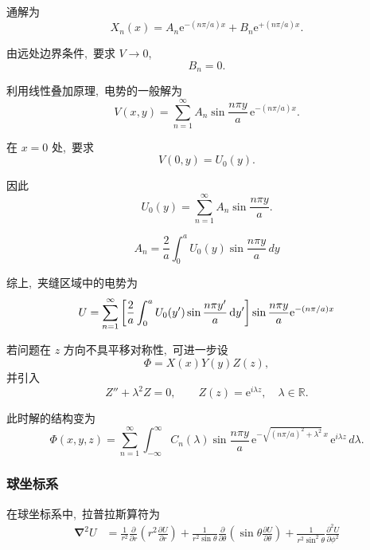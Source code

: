 通解为
\[
X_n(x)=A_n \mathrm{e}^{-(n\pi/a)x}+B_n \mathrm{e}^{+(n\pi/a)x}.
\]

由远处边界条件, \,要求 $V\to0$, \,
\[
B_n=0.
\]


利用线性叠加原理, \,电势的一般解为
\[
V(x,y)
=
\sum_{n=1}^{\infty}
A_n
\sin\frac{n\pi y}{a}
\,\mathrm{e}^{-(n\pi/a)x}.
\]

在 $x=0$ 处, \,要求
\[
V(0,y)=U_0(y).
\]

因此
\[
U_0(y)
=
\sum_{n=1}^{\infty}
A_n
\sin\frac{n\pi y}{a}.
\]

\[
{
A_n
=
\frac{2}{a}
\int_0^a
U_0(y)
\sin\frac{n\pi y}{a}
\,dy
}
\]




综上, \,夹缝区域中的电势为
\[
{
U
=
\sum_{n=1}^{\infty}
\left[
\frac{2}{a}
\int_0^a
U_0(y')
\sin\frac{n\pi y'}{a}
\dif y'
\right]
\sin\frac{n\pi y}{a}
\mathrm{e}^{-(n\pi/a)x}
}
\]

若问题在 $z$ 方向不具平移对称性, \,可进一步设
\[
\Phi = X(x)Y(y)Z(z),
\]
并引入
\[
Z'' + \lambda^2 Z = 0,
\qquad
Z(z)=\mathrm{e}^{i\lambda z},\quad \lambda\in\mathbb{R}.
\]

此时解的结构变为
\[
\Phi(x,y,z)
=
\sum_{n=1}^\infty
\int_{-\infty}^{\infty}
C_n(\lambda)
\sin\frac{n\pi y}{a}
\,\mathrm{e}^{-\sqrt{(n\pi/a)^2+\lambda^2}\,x}
\,\mathrm{e}^{i\lambda z}
\,d\lambda .
\]
\subsubsection{球坐标系}

在球坐标系中, \,拉普拉斯算符为
\begin{align*}
\boldsymbol\nabla^2 U
&=
\frac{1}{r^2}\frac{\partial}{\partial r}
\left(
r^2 \frac{\partial U}{\partial r}
\right)
+
\frac{1}{r^2\sin\theta}
\frac{\partial}{\partial\theta}
\left(
\sin\theta \frac{\partial U}{\partial\theta}
\right)
+
\frac{1}{r^2\sin^2\theta}
\frac{\partial^2 U}{\partial\phi^2}
\end{align*}

